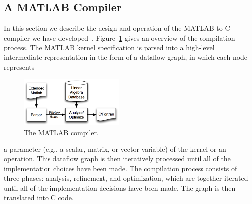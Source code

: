 \documentclass[runningheads]{llncs}
\begin{document}
\subsection{A MATLAB Compiler}
\label{sec:matlab}
%
In this section we describe the design and operation of the MATLAB to C compiler we have developed~\cite{Siek}.    Figure~\ref{fig:compiler} gives an overview of the compilation process. 
The MATLAB kernel specification is parsed into a high-level intermediate
representation in the form of a dataflow graph, in which each node represents
%
\begin{figure}
\centering
\includegraphics[width=2in]{figures/compile.png}
\caption{The MATLAB compiler.}
\label{fig:compiler}
\vspace{-.2in}
\end{figure}
%
a parameter (e.g., a scalar, matrix, or vector variable) of the kernel or an
operation.  This dataflow graph is then iteratively processed until all of
the implementation choices have been made.  The compilation process consists
of three phases: analysis, refinement, and optimization, which are together
iterated until all of the implementation decisions have been made.  The graph
is then translated into C code.

%
\end{document}
